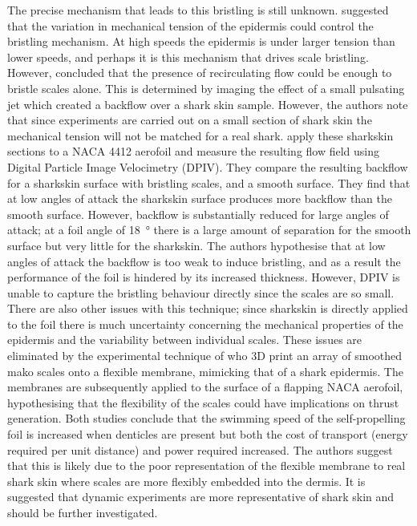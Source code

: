 \documentclass[12pt,oneside,a4paper]{article}
\begin{document}
The precise mechanism that leads to this bristling is still unknown. \cite{bechert1985} suggested that the variation in mechanical tension of the epidermis could control the bristling mechanism. At high speeds the epidermis is under larger tension than lower speeds, and perhaps it is this mechanism that drives scale bristling. However, \cite{lang2014} concluded that the presence of recirculating flow could be enough to bristle scales alone. This is determined by imaging the effect of a small pulsating jet which created a backflow over a shark skin sample. However, the authors note that since experiments are carried out on a small section of shark skin the mechanical tension will not be matched for a real shark. \cite{lang2014} apply these sharkskin sections to a NACA 4412 aerofoil and measure the resulting flow field using Digital Particle Image Velocimetry (DPIV). They compare the resulting backflow for a sharkskin surface with bristling scales, and a smooth surface. They find that at low angles of attack the sharkskin surface produces more backflow than the smooth surface. However, backflow is substantially reduced for large angles of attack; at a foil angle of \SI{18}{\degree} there is a large amount of separation for the smooth surface but very little for the sharkskin. The authors hypothesise that at low angles of attack the backflow is too weak to induce bristling, and as a result the performance of the foil is hindered by its increased thickness. However, DPIV is unable to capture the bristling behaviour directly since the scales are so small. There are also other issues with this technique; since sharkskin is directly applied to the foil there is much uncertainty concerning the mechanical properties of the epidermis and the variability between individual scales. These issues are eliminated by the experimental technique of \cite{wen2014,wen2015} who 3D print an array of smoothed mako scales onto a flexible membrane, mimicking that of a shark epidermis. The membranes are subsequently applied to the surface of a flapping NACA aerofoil, hypothesising that the flexibility of the scales could have implications on thrust generation. Both studies conclude that the swimming speed of the self-propelling foil is increased when denticles are present but both the cost of transport (energy required per unit distance) and power required increased. The authors suggest that this is likely due to the poor representation of the flexible membrane to real shark skin where scales are more flexibly embedded into the dermis. It is suggested that dynamic experiments are more representative of shark skin and should be further investigated.
\end{document}
